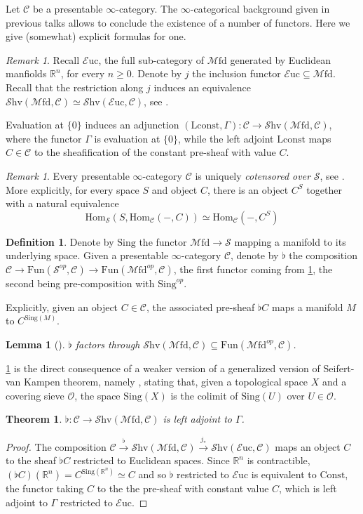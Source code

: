\documentclass[10pt]{amsart}
\newcommand{\C}{\mathscr{C}}
\newcommand{\s}{\mathscr{S}}
\newcommand{\bR}{\mathbb{R}}
\newcommand{\Hom}{\mathrm{Hom}}
\newcommand{\Fun}{\mathrm{Fun}}
\newcommand{\Euc}{\mathscr{E}\mathrm{uc}}
\newcommand{\Mfd}{\mathscr{M}\mathrm{fd}}
\newcommand{\Shv}{\mathscr{S}\mathrm{hv}}
\newcommand{\Sing}{\mathrm{Sing}}
\newcommand{\const}{\mathrm{Lconst}}
\newtheorem{theorem}[equation]{Theorem}
\newtheorem{lemma}[equation]{Lemma}
\theoremstyle{definition}
\newtheorem{definition}[equation]{Definition}
\theoremstyle{remark}
\newtheorem{remark}[equation]{Remark}
\numberwithin{equation}{section}
\begin{document}
Let $\C$ be a presentable $\infty$-category. The $\infty$-categorical background given in previous talks allows to conclude the existence of a number of functors. Here we give (somewhat) explicit formulas for one. 
\begin{remark}
  Recall $\Euc$, the full sub-category of $\Mfd$ generated by Euclidean manfiolds $\bR^n$, for every $n\geq0$. Denote by $j$ the inclusion functor $\Euc\subseteq\Mfd$. Recall that the restriction along $j$ induces an equivalence $\Shv(\Mfd,\C)\simeq\Shv(\Euc,\C)$, see \cite[Corollary A.5.6]{amabeldebrayhaine2021diffcoh}.
\end{remark}
Evaluation at $\{0\}$ induces an adjunction $(\const,\Gamma):\C\to\Shv(\Mfd,\C)$, where the functor $\Gamma$ is evaluation at $\{0\}$, while the left adjoint $\const$ maps $C\in\C$ to the sheafification of the constant pre-sheaf with value $C$. 
\begin{remark}\label{rmk:cotensor}
Every presentable $\infty$-category $\C$ is uniquely \emph{cotensored over} $\s$, see \cite[Remark 5.5.2.6]{lurie2009htt}. More explicitly, for every space $S$ and object $C$, there is an object $C^S$ together with a natural equivalence $$\Hom_\s(S,\Hom_\C(-,C))\simeq\Hom_\C(-,C^S)$$
\end{remark}
\begin{definition}
  Denote by $\Sing$ the functor $\Mfd\to\s$ mapping a manifold to its underlying space. Given a presentable $\infty$-category $\C$, denote by $\flat$ the composition $\C\to\Fun(\s^{op},\C)\to\Fun(\Mfd^{op},\C)$, the first functor coming from \cref{rmk:cotensor}, the second being pre-composition with $\Sing^{op}$.
\end{definition}
Explicitly, given an object $C\in\C$, the associated pre-sheaf $\flat C$ maps a manifold $M$ to $C^{\Sing(M)}$. 
\begin{lemma}[{\cite[Corollary 6.46]{bunkegepner2021differential}}]\label{lem:flatsheaf}
  $\flat$ factors through $\Shv(\Mfd,\C)\subseteq\Fun(\Mfd^{op},\C)$.
\end{lemma}
\cref{lem:flatsheaf} is the direct consequence of a weaker version of a generalized version of Seifert-van Kampen theorem, namely \cite[Proposition A.3.2]{lurie2017ha}, stating that, given a topological space $X$ and a covering sieve $\mathscr{O}$, the space $\Sing(X)$ is the colimit of $\Sing(U)$ over $U\in\mathscr{O}$.
\begin{theorem}
  $\flat:\C\to\Shv(\Mfd,\C)$ is left adjoint to $\Gamma$.
\end{theorem}
\begin{proof}
  The composition $\C\xrightarrow{\flat}\Shv(\Mfd,\C)\xrightarrow{j_*}\Shv(\Euc,\C)$ maps an object $C$ to the sheaf $\flat C$ restricted to Euclidean spaces. Since $\bR^n$ is contractible, $(\flat C)(\bR^n)=C^{\Sing(\bR^n)}\simeq C$ and so $\flat$ restricted to $\Euc$ is equivalent to $\mathrm{Const}$, the functor taking $C$ to the the pre-sheaf with constant value $C$, which is left adjoint to $\Gamma$ restricted to $\Euc$.
\end{proof}
\end{document}
